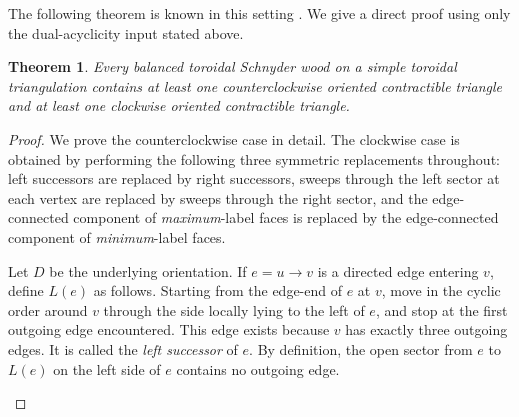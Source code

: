 \documentclass[11pt]{amsart}
\theoremstyle{plain}
\newtheorem{theorem}{Theorem}
\theoremstyle{definition}
\theoremstyle{remark}
\begin{document}
The following theorem is known in this setting \cite[Section~10]{despre-goncalves-leveque2017}. We give a direct proof using only the dual-acyclicity input stated above.

\begin{theorem}
\label{thm:balanced-oriented-triangles}
Every balanced toroidal Schnyder wood on a simple toroidal triangulation contains at least one counterclockwise oriented contractible triangle and at least one clockwise oriented contractible triangle.
\end{theorem}

\begin{proof}
We prove the counterclockwise case in detail. The clockwise case is obtained by performing the following three symmetric replacements throughout: left successors are replaced by right successors, sweeps through the left sector at each vertex are replaced by sweeps through the right sector, and the edge-connected component of \emph{maximum}-label faces is replaced by the edge-connected component of \emph{minimum}-label faces.

Let $D$ be the underlying orientation. If $e = u \to v$ is a directed edge entering $v$, define $L(e)$ as follows. Starting from the edge-end of $e$ at $v$, move in the cyclic order around $v$ through the side locally lying to the left of $e$, and stop at the first outgoing edge encountered. This edge exists because $v$ has exactly three outgoing edges. It is called the \emph{left successor} of $e$. By definition, the open sector from $e$ to $L(e)$ on the left side of $e$ contains no outgoing edge.

\begin{figure}[ht]
\centering
{}
\end{figure}
\end{proof}
\end{document}
